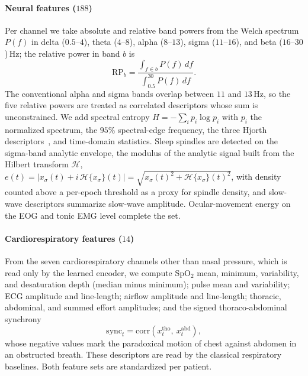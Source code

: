 \documentclass[a4paper,fleqn]{cas-sc}
\begin{document}
\paragraph{Neural features ($188$)}
Per channel we take absolute and relative band powers from the Welch spectrum $P(f)$ in delta
($0.5$--$4$), theta ($4$--$8$), alpha ($8$--$13$), sigma ($11$--$16$), and beta
($16$--$30$)\,Hz; the relative power in band $b$ is
\begin{equation}
\mathrm{RP}_b=\frac{\int_{f\in b}P(f)\,df}{\int_{0.5}^{30}P(f)\,df}.
\end{equation}
The conventional alpha and sigma bands overlap between $11$ and $13$\,Hz, so the five relative
powers are treated as correlated descriptors whose sum is unconstrained.
We add spectral entropy $H=-\sum_i p_i\log p_i$ with $p_i$ the normalized spectrum, the
$95\%$ spectral-edge frequency, the three Hjorth descriptors~\cite{hjorth1970eeg}, and
time-domain statistics. Sleep spindles are detected on the sigma-band analytic envelope,
the modulus of the analytic signal built from the Hilbert transform $\mathcal{H}$,
$e(t)=\lvert x_\sigma(t)+i\,\mathcal{H}\{x_\sigma\}(t)\rvert=\sqrt{x_\sigma(t)^2+\mathcal{H}\{x_\sigma\}(t)^2}$, with
density counted above a per-epoch threshold as a proxy for spindle density, and slow-wave
descriptors summarize slow-wave amplitude. Ocular-movement energy on the EOG and tonic EMG level
complete the set.

\paragraph{Cardiorespiratory features ($14$)}
From the seven cardiorespiratory channels other than nasal pressure, which is read only by the
learned encoder, we compute SpO$_2$ mean, minimum, variability, and
desaturation depth (median minus minimum); pulse mean and variability; ECG amplitude and
line-length; airflow amplitude and line-length; thoracic, abdominal, and summed effort
amplitudes; and the signed thoraco-abdominal synchrony
\begin{equation}
\mathrm{sync}_t=\mathrm{corr}(x^{\mathrm{tho}}_t,\ x^{\mathrm{abd}}_t),
\end{equation}
whose negative values mark the paradoxical motion of chest against abdomen in an obstructed
breath. These descriptors are read by the classical
respiratory baselines. Both feature sets are standardized per patient.
\end{document}
